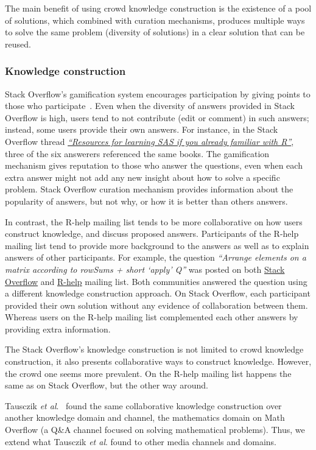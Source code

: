 \documentclass{sig-alternate-05-2015}
\begin{document}
The main benefit of using crowd knowledge construction is the existence of a pool of solutions, which combined with curation mechanisms, produces multiple ways to solve the same problem (diversity of solutions) in a clear solution that can be reused.

	\subsubsection{Knowledge construction}

	Stack Overflow's gamification system encourages participation by giving points to those who participate~\cite{Singer2013}.
	Even when the diversity of answers provided in Stack Overflow is high, users tend to not contribute (edit or comment) in such answers; instead, some users provide their own answers.
	For instance, in the Stack Overflow thread \textit{\href{http://goo.gl/Mb4Pbk}{``Resources for learning SAS if you already familiar with R''}}, three of the six answerers referenced the same books.
	The gamification mechanism gives reputation to those who answer the questions, even when each extra answer might not add any new insight about how to solve a specific problem.
	Stack Overflow curation mechanism provides information about the popularity of answers, but not why, or how it is better than others answers.

	In contrast, the R-help mailing list tends to be more collaborative on how users construct knowledge, and discuss proposed answers.
	Participants of the R-help mailing list tend to provide more background to the answers as well as to explain answers of other participants.
	For example, the question \textit{``Arrange elements on a matrix according to rowSums + short `apply' Q''} was posted on both \href{http://goo.gl/a8AES8}{Stack Overflow} and \href{http://goo.gl/PGflT5}{R-help} mailing list.
	Both communities answered the question using a different knowledge construction approach.
	On Stack Overflow, each participant provided their own solution without any evidence of collaboration between them.
	Whereas users on the R-help mailing list complemented each other answers by providing extra information.

	The Stack Overflow's knowledge construction is not limited to crowd knowledge construction, it also presents collaborative ways to construct knowledge.
	However, the crowd one seems more prevalent.
	On the R-help mailing list happens the same as on Stack Overflow, but the other way around.


	Tausczik \textit{et al}.~\cite{Tausczik2014} found the same collaborative knowledge construction over another knowledge domain and channel, the mathematics domain on Math Overflow (a Q\&A channel focused on solving mathematical problems).
	Thus, we extend what Tausczik \textit{et al}. found to other media channels and domains.
\end{document}
